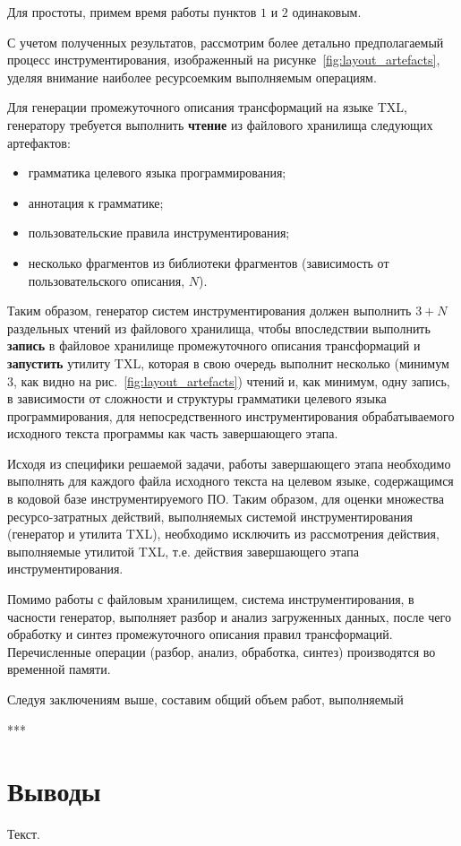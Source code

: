 Для простоты, примем время работы пунктов $1$ и $2$ одинаковым.

С учетом полученных результатов, рассмотрим более детально предполагаемый процесс инструментирования, изображенный на рисунке~\ref{fig:layout_artefacts}, уделяя внимание наиболее ресурсоемким выполняемым операциям.

Для генерации промежуточного описания трансформаций на языке TXL, генератору требуется выполнить \textbf{чтение} из файлового хранилища следующих артефактов:
\begin{itemize}
  \item грамматика целевого языка программирования;
  \item аннотация к грамматике;
  \item пользовательские правила инструментирования;
  \item несколько фрагментов из библиотеки фрагментов (зависимость от пользовательского описания, $N$).
\end{itemize}

Таким образом, генератор систем инструментирования должен выполнить $3 + N$ раздельных чтений из файлового хранилища, чтобы впоследствии выполнить \textbf{запись} в файловое хранилище промежуточного описания трансформаций и \textbf{запустить} утилиту TXL, которая в свою очередь выполнит несколько (минимум $3$, как видно на рис.~\ref{fig:layout_artefacts}) чтений и, как минимум, одну запись, в зависимости от сложности и структуры грамматики целевого языка программирования, для непосредственного инструментирования обрабатываемого исходного текста программы как часть завершающего этапа.

Исходя из специфики решаемой задачи, работы завершающего этапа необходимо выполнять для каждого файла исходного текста на целевом языке, содержащимся в кодовой базе инструментируемого ПО.
Таким образом, для оценки множества ресурсо-затратных действий, выполняемых системой инструментирования (генератор и утилита TXL), необходимо исключить из рассмотрения действия, выполняемые утилитой TXL, т.е. действия завершающего этапа инструментирования.

Помимо работы с файловым хранилищем, система инструментирования, в часности генератор, выполняет разбор и анализ загруженных данных, после чего обработку и синтез промежуточного описания правил трансформаций.
Перечисленные операции (разбор, анализ, обработка, синтез) производятся во временной памяти.

Следуя заключениям выше, составим общий объем работ, выполняемый

***

\section{Выводы}

Текст.
